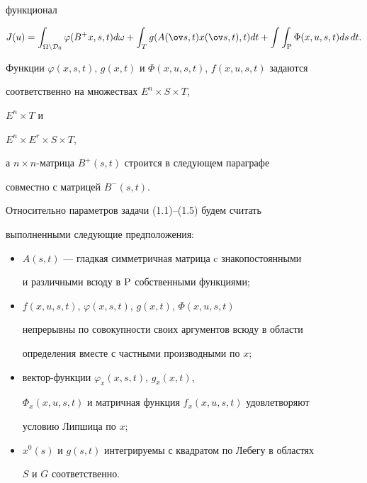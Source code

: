 функционал


\begin{equation}


J(u) = \int_{\Omega \setminus {\cal D}_0}


\varphi(B^+x,s,t)d \omega +


\int_{T} g(A({\ov s},t) x({\ov s,t}),t)dt +


\int \int_{\mathrm P} \Phi(x,u,s,t) ds\, dt.


\end{equation}


Функции $\varphi(x,s,t)$, $g(x,t)$ и $\Phi(x,u,s,t)$, $f(x,u,s,t)$ задаются


соответственно на множествах $E^n \times S \times T$,


$E^n \times T$ и


$E^n \times E^r \times S \times T$,


а $n \times n$-матрица $B^+(s,t)$ строится в следующем параграфе


совместно с матрицей $B^-(s,t)$.





Относительно параметров задачи (1.1)--(1.5) будем считать


выполненными следующие предположения:


\begin{itemize}


\item[1)] $A(s,t)$ --- гладкая симметричная матрица c знакопостоянными


и различными всюду в $\P$ собственными функциями;


\item[2)] $f(x,u,s,t)$, $\varphi(x,s,t)$, $g(x,t)$, $\Phi(x,u,s,t)$


непрерывны по совокупности своих аргументов всюду в области


определения вместе с частными производными по $x$;


\item[3)] вектор-функции $\varphi_x(x,s,t)$, $g_x(x,t)$,


$\Phi_x(x,u,s,t)$ и матричная функция $f_x(x,u,s,t)$ удовлетворяют


условию Липшица по $x$;


\item[4)] $x^0(s)$ и $g(s,t)$ интегрируемы с квадратом по Лебегу в областях


$S$ и $G$ соответственно.


\end{itemize}





